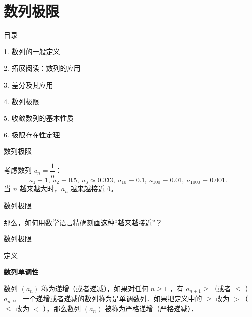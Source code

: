 \documentclass[aspectratio=169,10pt,fontset=fandol]{ctexbeamer}
\begin{document}
\section{数列极限}
\begin{frame}[t,fragile]{目录}
\normalsize
{\color{black}\normalsize 1. 数列的一般定义\par}\vspace{0.3em}
{\color{black}\normalsize 2. 拓展阅读：数列的应用\par}\vspace{0.3em}
{\color{black}\normalsize 3. 差分及其应用\par}\vspace{0.3em}
{\color{blue}\normalsize 4. 数列极限\par}\vspace{0.3em}
{\color{gray!40}\normalsize 5. 收敛数列的基本性质\par}\vspace{0.3em}
{\color{gray!40}\normalsize 6. 极限存在性定理\par}\vspace{0.3em}
\end{frame}
\begin{frame}[t,fragile]{数列极限}
\footnotesize
{\footnotesize
考虑数列 \(a_n = \dfrac{1}{n}\)：
\[
a_1=1,\ a_2=0.5,\ a_3\approx 0.333,\ a_{10}=0.1,\ a_{100}=0.01,\ a_{1000}=0.001.
\]
当 \(n\) 越来越大时，\(a_n\) 越来越接近 0。


}
\end{frame}
\begin{frame}[t,fragile]{数列极限}
\footnotesize
{\footnotesize
那么，如何用数学语言精确刻画这种“越来越接近”？


}
\end{frame}
\begin{frame}[t,fragile]{数列极限}
\footnotesize
\begin{block}{定义}
{\footnotesize
\textbf{数列单调性}\par

	数列 $\left(a_n\right)$ 称为递增（或者递减），如果对任何 $n \geqslant 1$ ，有 $a_{n+1} \geqslant$（或者 $\leqslant$ ）$a_n$ 。
	一个递增或者递减的数列称为是单调数列．如果把定义中的 $\geqslant$ 改为 $>$（ $\leqslant$ 改为 $<$ ），那么数列 $\left(a_n\right)$ 被称为严格递增（严格递减）．

}
\end{block}
\end{frame}
\end{document}
